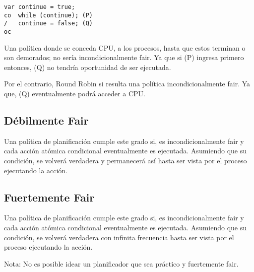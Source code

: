 \documentclass[a4paper, 10pt]{report}
\begin{document}
\begin{lstlisting}
var continue = true;
co  while (continue); (P)
/   continue = false; (Q)
oc
\end{lstlisting}


Una política donde se conceda CPU, a los procesos, hasta que estos terminan o son demorados; no sería incondicionalmente fair. Ya que si (P) ingresa primero entonces, (Q) no tendría oportunidad de ser ejecutada.

Por el contrario, Round Robin si resulta una política incondicionalmente fair. Ya que, (Q) eventualmente podrá acceder a CPU.

\subsection{Débilmente Fair}

Una política de planificación cumple este grado si, es incondicionalmente fair y cada acción atómica condicional eventualmente es ejecutada. Asumiendo que su condición, se volverá verdadera y permanecerá así hasta ser vista por el proceso ejecutando la acción.

\subsection{Fuertemente Fair}

Una política de planificación cumple este grado si, es incondicionalmente fair y cada acción atómica condicional eventualmente es ejecutada. Asumiendo que su condición, se volverá verdadera con infinita frecuencia hasta ser vista por el proceso ejecutando la acción.

Nota: No es posible idear un planificador que sea práctico y fuertemente fair.
\end{document}
